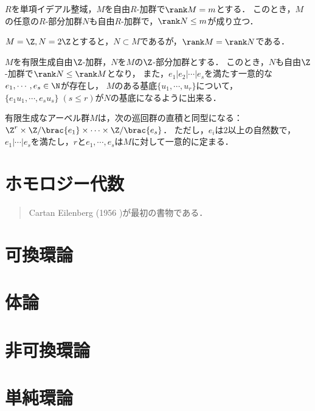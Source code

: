 \documentclass[uplatex,dvipdfmx]{jsreport}
\begin{document}
\begin{theorem}
    $R$を単項イデアル整域，$M$を自由$R$-加群で$\rank M=m$とする．
    このとき，$M$の任意の$R$-部分加群$N$も自由$R$-加群で，$\rank N\le m$が成り立つ．
\end{theorem}

\begin{example}[線形空間論との違い]
    $M=\Z,N=2\Z$とすると，$N\subset M$であるが，$\rank M=\rank N$である．
\end{example}

\begin{theorem}
    $M$を有限生成自由$\Z$-加群，$N$を$M$の$\Z$-部分加群とする．
    このとき，$N$も自由$\Z$-加群で$\rank N\le\rank M$となり，
    また，$e_1|e_2|\cdots|e_s$を満たす一意的な$e_1,\cdots,e_s\in\N$が存在し，
    $M$のある基底$\{u_1,\cdots,u_r\}$について，$\{e_1u_1,\cdots,e_su_s\}\;(s\le r)$が$N$の基底になるように出来る．
\end{theorem}

\begin{corollary}
    有限生成なアーベル群$M$は，次の巡回群の直積と同型になる：$\Z^r\times\Z/\brac{e_1}\times\cdots\times\Z/\brac{e_s}$．
    ただし，$e_i$は$2$以上の自然数で，$e_1|\cdots|e_s$を満たし，$r$と$e_1,\cdots,e_s$は$M$に対して一意的に定まる．
\end{corollary}

\chapter{ホモロジー代数}

\begin{quotation}
    Cartan Eilenberg (1956 \cite{Cartan-Eilenberg})が最初の書物である．
\end{quotation}

\chapter{可換環論}

\chapter{体論}

\chapter{非可換環論}

\chapter{単純環論}
\end{document}

